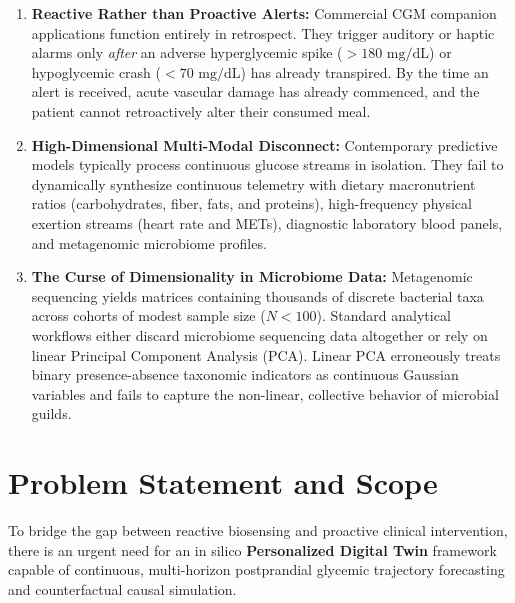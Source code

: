 \begin{enumerate}
    \item \textbf{Reactive Rather than Proactive Alerts:} Commercial CGM companion applications function entirely in retrospect. They trigger auditory or haptic alarms only \emph{after} an adverse hyperglycemic spike ($>180\text{ mg/dL}$) or hypoglycemic crash ($<70\text{ mg/dL}$) has already transpired. By the time an alert is received, acute vascular damage has already commenced, and the patient cannot retroactively alter their consumed meal.
    \item \textbf{High-Dimensional Multi-Modal Disconnect:} Contemporary predictive models typically process continuous glucose streams in isolation. They fail to dynamically synthesize continuous telemetry with dietary macronutrient ratios (carbohydrates, fiber, fats, and proteins), high-frequency physical exertion streams (heart rate and METs), diagnostic laboratory blood panels, and metagenomic microbiome profiles.
    \item \textbf{The Curse of Dimensionality in Microbiome Data:} Metagenomic sequencing yields matrices containing thousands of discrete bacterial taxa across cohorts of modest sample size ($N < 100$). Standard analytical workflows either discard microbiome sequencing data altogether or rely on linear Principal Component Analysis (PCA). Linear PCA erroneously treats binary presence-absence taxonomic indicators as continuous Gaussian variables and fails to capture the non-linear, collective behavior of microbial guilds.
\end{enumerate}

\section{Problem Statement and Scope}
To bridge the gap between reactive biosensing and proactive clinical intervention, there is an urgent need for an in silico \textbf{Personalized Digital Twin} framework capable of continuous, multi-horizon postprandial glycemic trajectory forecasting and counterfactual causal simulation. 

